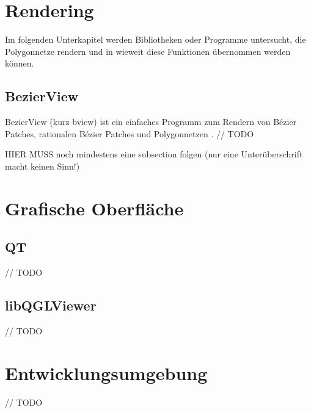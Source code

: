 \section{Rendering}

Im folgenden Unterkapitel werden Bibliotheken oder Programme untersucht, die Polygonnetze rendern
und in wieweit diese Funktionen übernommen werden können. 

\subsection{BezierView}

BezierView (kurz bview) ist ein einfaches Programm zum Rendern von Bézier Patches, rationalen Bézier Patches und Polygonnetzen \cite{Peters.bview.27.07.2015}.
// TODO

HIER MUSS noch mindestens eine subsection folgen (nur eine Unterüberschrift macht keinen Sinn!)

\section{Grafische Oberfläche}

\subsection{QT}

// TODO

\subsection{libQGLViewer}

// TODO

\section{Entwicklungsumgebung}

// TODO

